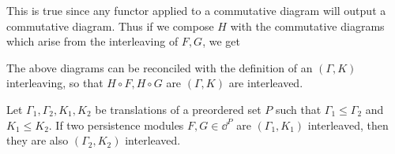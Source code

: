 \begin{prf}
    This is true since any functor applied to a commutative diagram will output a commutative diagram. 
    Thus if we compose $H$ with the commutative diagrams which arise from the interleaving 
    of $F, G$,  we get 
    \begin{center}
        \hspace{1cm}
    \end{center}
    \begin{center}
    \end{center}
    The above diagrams can be reconciled with the definition of an $(\Gamma, K)$ 
    interleaving, so that $H\circ F, H\circ G$  are $(\Gamma, K)$ are  
    interleaved. 
\end{prf}

\begin{proposition}[Monotonicity]
    Let $\Gamma_1, \Gamma_2, K_1, K_2$ be translations of a preordered set $P$ 
    such that $\Gamma_1  \le \Gamma_2$ and $K_1  \le  K_2$. If two persistence modules 
    $F, G \in \dd^{P}$ are $(\Gamma_1, K_1)$ interleaved, then they are also 
    $(\Gamma_2, K_2)$ interleaved. 
\end{proposition}\label{prop_monotonocity}

